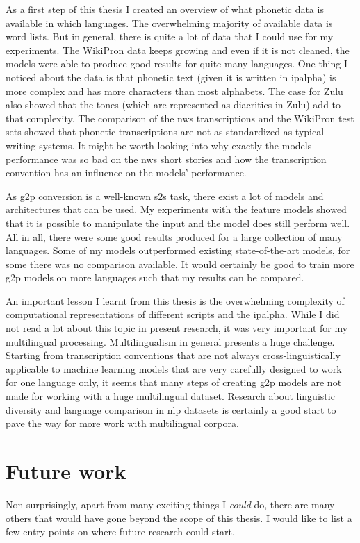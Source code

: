 \label{chap:6_conclusion}
As a first step of this thesis I created an overview of what phonetic data is available in which languages. The overwhelming majority of available data is word lists. But in general, there is quite a lot of data that I could use for my experiments. The WikiPron data keeps growing and even if it is not cleaned, the models were able to produce good results for quite many languages. One thing I noticed about the data is that phonetic text (given it is written in \ac{ipalpha}) is more complex and has more characters than most alphabets. The case for Zulu also showed that the tones (which are represented as diacritics in Zulu) add to that complexity. The comparison of the \ac{nws} transcriptions and the WikiPron test sets showed that phonetic transcriptions are not as standardized as typical writing systems. It might be worth looking into why exactly the models performance was so bad on the \ac{nws} short stories and how the transcription convention has an influence on the models' performance.

As \ac{g2p} conversion is a well-known \ac{s2s} task, there exist a lot of models and architectures that can be used. My experiments with the feature models showed that it is possible to manipulate the input and the model does still perform well. All in all, there were some good results produced for a large collection of many languages. Some of my models outperformed existing state-of-the-art models, for some there was no comparison available. It would certainly be good to train more \ac{g2p} models on more languages such that my results can be compared. 

An important lesson I learnt from this thesis is the overwhelming complexity of computational representations of different scripts and the \ac{ipalpha}. While I did not read a lot about this topic in present research, it was very important for my multilingual processing. Multilingualism in general presents a huge challenge. Starting from transcription conventions that are not always cross-linguistically applicable to machine learning models that are very carefully designed to work for one language only, it seems that many steps of creating \ac{g2p} models are not made for working with a huge multilingual dataset. Research about linguistic diversity and language comparison in \ac{nlp} datasets is certainly a good start to pave the way for more work with multilingual corpora.

\section*{Future work}
Non surprisingly, apart from many exciting things I \textit{could} do, there are many others that would have gone beyond the scope of this thesis. I would like to list a few entry points on where future research could start. 

